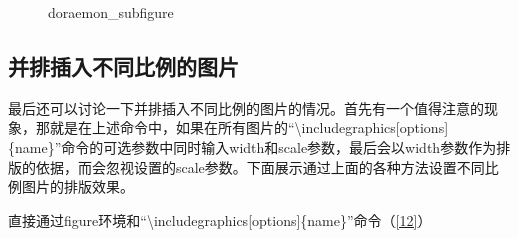 \documentclass{article}
\begin{document}
\begin{figure}[htbp]
{\begin{subfigure}{.25\textwidth}
            \end{subfigure}
        }
        \hfill
        \hfill
        \caption{doraemon\_subfigure}
        \label{11}
    \end{figure}

\subsection{并排插入不同比例的图片}
    最后还可以讨论一下并排插入不同比例的图片的情况。首先有一个值得注意的现象，那就是在上述命令中，如果在所有图片的``\textbackslash includegraphics[options]\{name\}''命令的可选参数中同时输入width和scale参数，最后会以width参数作为排版的依据，而会忽视设置的scale参数。下面展示通过上面的各种方法设置不同比例图片的排版效果。

    直接通过figure环境和``\textbackslash includegraphics[options]\{name\}''命令（\ref{12}）
\end{document}
